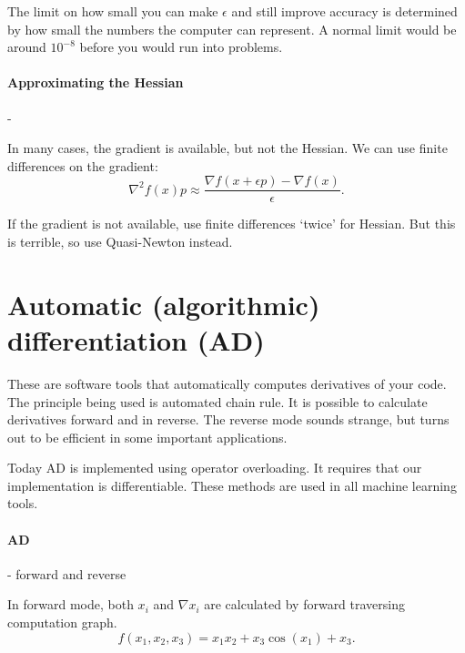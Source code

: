 \documentclass{article}
\begin{document}
\medskip The limit on how small you can make $\epsilon$ and still improve accuracy is determined by how small the numbers the computer can 
represent. A normal limit would be around $10^{-8}$ before you would run into problems. 


\paragraph{Approximating the Hessian}- 

\medskip In many cases, the gradient is available, but not the Hessian. We can use finite differences on the gradient:
\[
  \nabla ^2 f(x) p \approx \frac{\nabla f(x + \epsilon p) - \nabla f(x)}{\epsilon}
.\]   

If the gradient is not available, use finite differences `twice' for Hessian. But this is terrible, so use Quasi-Newton instead. 

\section{Automatic (algorithmic) differentiation (AD)}

These are software tools that automatically computes derivatives of your code. The principle being used is automated chain rule. 
It is possible to calculate derivatives forward and in reverse. The reverse mode sounds strange, but turns out to be efficient in some
important applications. 

\medskip Today AD is implemented using operator overloading. It requires that our implementation is differentiable. These methods are 
used in all machine learning tools. 

\paragraph{AD}- forward and reverse

\medskip In forward mode, both $x_i$ and $\nabla x_i$ are calculated by forward traversing computation graph. 
\[
  f(x_1, x_2, x_3) = x_1x_2+x_3 \cos{(x_1)} + x_3
.\] 
\end{document}
